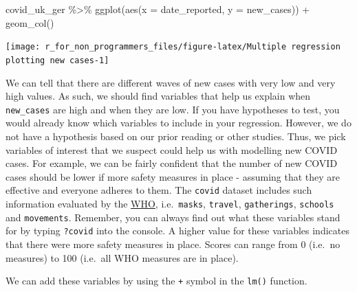 \documentclass[
]{book}
\newenvironment{Shaded}{\begin{snugshade}}{\end{snugshade}}
\newcommand{\AttributeTok}[1]{\textcolor[rgb]{0.77,0.63,0.00}{#1}}
\newcommand{\FunctionTok}[1]{\textcolor[rgb]{0.00,0.00,0.00}{#1}}
\newcommand{\NormalTok}[1]{#1}
\newcommand{\SpecialCharTok}[1]{\textcolor[rgb]{0.00,0.00,0.00}{#1}}
\begin{document}
\begin{Shaded}
\begin{Highlighting}[]
\NormalTok{covid\_uk\_ger }\SpecialCharTok{\%\textgreater{}\%}
  \FunctionTok{ggplot}\NormalTok{(}\FunctionTok{aes}\NormalTok{(}\AttributeTok{x =}\NormalTok{ date\_reported,}
             \AttributeTok{y =}\NormalTok{ new\_cases)) }\SpecialCharTok{+}
  \FunctionTok{geom\_col}\NormalTok{()}
\end{Highlighting}
\end{Shaded}

\begin{center}\texttt{[image: r\_for\_non\_programmers\_files/figure-latex/Multiple regression plotting new cases-1]} \end{center}

We can tell that there are different waves of new cases with very low and very high values. As such, we should find variables that help us explain when \texttt{new\_cases} are high and when they are low. If you have hypotheses to test, you would already know which variables to include in your regression. However, we do not have a hypothesis based on our prior reading or other studies. Thus, we pick variables of interest that we suspect could help us with modelling new COVID cases. For example, we can be fairly confident that the number of new COVID cases should be lower if more safety measures in place - assuming that they are effective and everyone adheres to them. The \texttt{covid} dataset includes such information evaluated by the \href{https://covid19.who.int/info/}{WHO}, i.e.~\texttt{masks}, \texttt{travel}, \texttt{gatherings}, \texttt{schools} and \texttt{movements}. Remember, you can always find out what these variables stand for by typing \texttt{?covid} into the console. A higher value for these variables indicates that there were more safety measures in place. Scores can range from 0 (i.e.~no measures) to 100 (i.e.~all WHO measures are in place).

We can add these variables by using the \texttt{+} symbol in the \texttt{lm()} function.
\end{document}
